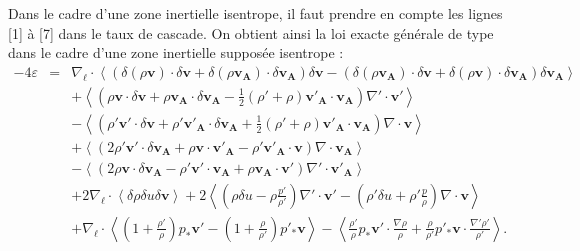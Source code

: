 Dans le cadre d'une zone inertielle isentrope, il faut prendre en compte les lignes [1] à [7] dans le taux de cascade. On obtient ainsi la \og loi exacte générale de type  dans le cadre d'une zone inertielle supposée isentrope \fg{} : 
\begin{equation}
\boxed{
\begin{array}{lcl}
\label{eq:turb_elg_f1} -4\varepsilon &=& \nabla_{\boldsymbol{\ell}} \cdot \left<\left(\delta \left(\rho\boldsymbol{v}\right) \cdot \delta \boldsymbol{v}+ \delta \left(\rho\boldsymbol{v_A}\right) \cdot \delta \boldsymbol{v_A} \right)\delta \boldsymbol{v}  -\left(\delta \left(\rho\boldsymbol{v_A}\right) \cdot \delta \boldsymbol{v}  + \delta \left(\rho\boldsymbol{v}\right) \cdot \delta \boldsymbol{v_A}  \right) \delta \boldsymbol{v_A} \right>\\
&& +\left< \left(\rho \boldsymbol{v} \cdot \delta \boldsymbol{v} +\rho \boldsymbol{v_A} \cdot \delta \boldsymbol{v_A} -\frac{1}{2} \left(\rho'+\rho\right) \boldsymbol{v'_A} \cdot \boldsymbol{v_A} \right) \nabla' \cdot \boldsymbol{v'} \right>\\
&& -\left< \left(\rho' \boldsymbol{v'} \cdot \delta \boldsymbol{v} + \rho' \boldsymbol{v'_A} \cdot \delta \boldsymbol{v_A} + \frac{1}{2} \left(\rho'+\rho\right) \boldsymbol{v'_A} \cdot \boldsymbol{v_A}  \right)\nabla \cdot \boldsymbol{v}\right>\\
&&+ \left<\left(2 \rho' \boldsymbol{v'} \cdot \delta \boldsymbol{v_A}+\rho \boldsymbol{v} \cdot \boldsymbol{v'_A} - \rho' \boldsymbol{v'_A} \cdot \boldsymbol{v}  \right)\nabla \cdot \boldsymbol{v_A}\right>\\
&&- \left<\left(2\rho \boldsymbol{v} \cdot \delta \boldsymbol{v_A} -\rho' \boldsymbol{v'} \cdot \boldsymbol{v_A} +  \rho \boldsymbol{v_A} \cdot \boldsymbol{v'} \right)\nabla' \cdot \boldsymbol{v'_A}\right> \\
&&+ 2 \nabla_{\boldsymbol{\ell}} \cdot \left<\delta \rho  \delta u \delta \boldsymbol{v}\right> + 2\left<\left(\rho \delta u- \rho \frac{p'}{\rho'}\right)\nabla' \cdot \boldsymbol{v'}  - \left(\rho' \delta u + \rho' \frac{p}{\rho}\right) \nabla \cdot \boldsymbol{v} \right>\\
&&+  \nabla_{\boldsymbol{\ell}} \cdot \left< \left(1+\frac{\rho'}{\rho}\right)p_*  \boldsymbol{v'} -  \left(1+\frac{\rho}{\rho'}\right)p'_*  \boldsymbol{v} \right>- \left<\frac{\rho'}{\rho} p_*  \boldsymbol{v'} \cdot \frac{\nabla \rho}{\rho} + \frac{\rho}{\rho'} p'_*  \boldsymbol{v} \cdot \frac{\nabla' \rho'}{\rho'} \right>.
\end{array}}
\end{equation} 



